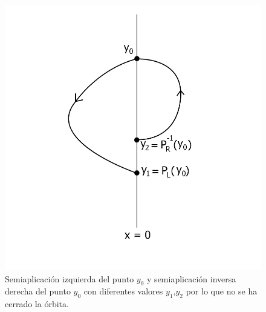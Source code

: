 \documentclass[12pt,a4paper]{report} %
\begin{document}
	\begin{figure}[h]
		\centering
		\includegraphics[width=1.1\textwidth,center]{aplipoincareL-R.jpg}
		\caption{Semiaplicación izquierda del punto $y_0$ y semiaplicación inversa derecha del punto $y_0$ con diferentes valores $y_1$,$y_2$ por lo que no se ha cerrado la órbita.}
		\label{fig:aplipoincareL-R}
	\end{figure}
	
	\newpage
	
\end{document}
